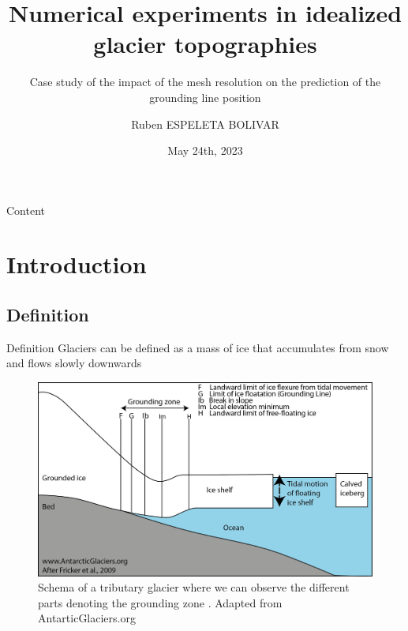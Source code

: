 \documentclass[11pt]{beamer}
\author{Ruben ESPELETA BOLIVAR}
\title[Numerical experiments]{Numerical experiments in idealized glacier topographies}
\date{May 24th, 2023}
\subtitle{Case study of the impact of the mesh resolution on the prediction of the grounding line position}
\institute[IGE]{
	\inst{1}
	Institut des geosciences de l'environnement
}
\begin{document}
	\begin{frame}
		\maketitle
	\end{frame}
	
	\begin{frame}{Content}
		\tableofcontents
	\end{frame}
	
	\section{Introduction}
	\subsection{Definition}
		\begin{frame}{Definition}
		\justifying
		Glaciers can be defined as a mass of ice that accumulates from snow and flows slowly downwards
		\begin{figure}
		\centering
		\includegraphics[scale=0.4]{../fig/groundingzone.png}
		\caption{Schema of a tributary glacier where we can observe the different parts denoting the grounding zone \cite[]{fricker2009mapping}. Adapted from AntarticGlaciers.org}
		\label{Glacier}
		\end{figure}
		\end{frame}
\end{document}
